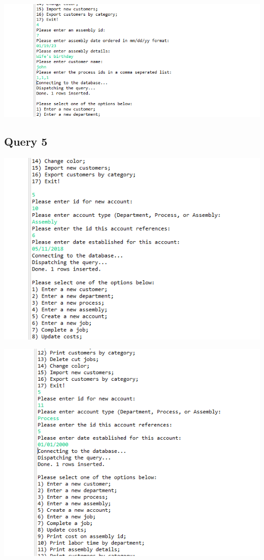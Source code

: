 \documentclass[11pt]{article}
\begin{document}
\includegraphics[width = \textwidth]{ass5.png}

\subsection{Query 5}


\includegraphics[width = \textwidth]{acct1.png}

\includegraphics[width = \textwidth]{acct2.png}
\end{document}
